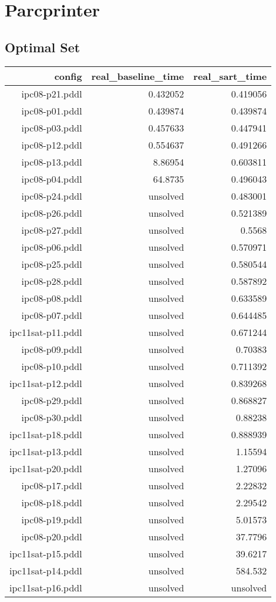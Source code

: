 \documentclass{article}
\begin{document}
                \newpage \section{Parcprinter}
                    \subsection*{Optimal Set}
                    
                            \begin{center}
                            \scriptsize
                            \begin{tabular}{r|r|r}
                            config & real\_baseline\_time & real\_sart\_time\\\midrule
                             ipc08-p21.pddl&0.432052&0.419056\\
 ipc08-p01.pddl&0.439874&0.439874\\
 ipc08-p03.pddl&0.457633&0.447941\\
 ipc08-p12.pddl&0.554637&0.491266\\
 ipc08-p13.pddl&8.86954&0.603811\\
 ipc08-p04.pddl&64.8735&0.496043\\
 ipc08-p24.pddl&unsolved&0.483001\\
 ipc08-p26.pddl&unsolved&0.521389\\
 ipc08-p27.pddl&unsolved&0.5568\\
 ipc08-p06.pddl&unsolved&0.570971\\
 ipc08-p25.pddl&unsolved&0.580544\\
 ipc08-p28.pddl&unsolved&0.587892\\
 ipc08-p08.pddl&unsolved&0.633589\\
 ipc08-p07.pddl&unsolved&0.644485\\
 ipc11sat-p11.pddl&unsolved&0.671244\\
 ipc08-p09.pddl&unsolved&0.70383\\
 ipc08-p10.pddl&unsolved&0.711392\\
 ipc11sat-p12.pddl&unsolved&0.839268\\
 ipc08-p29.pddl&unsolved&0.868827\\
 ipc08-p30.pddl&unsolved&0.88238\\
 ipc11sat-p18.pddl&unsolved&0.888939\\
 ipc11sat-p13.pddl&unsolved&1.15594\\
 ipc11sat-p20.pddl&unsolved&1.27096\\
 ipc08-p17.pddl&unsolved&2.22832\\
 ipc08-p18.pddl&unsolved&2.29542\\
 ipc08-p19.pddl&unsolved&5.01573\\
 ipc08-p20.pddl&unsolved&37.7796\\
 ipc11sat-p15.pddl&unsolved&39.6217\\
 ipc11sat-p14.pddl&unsolved&584.532\\
 ipc11sat-p16.pddl&unsolved&unsolved
                            \end{tabular}
                            \end{center}
                    
\end{document}
